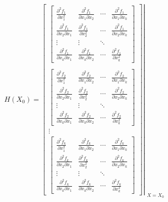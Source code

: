 \begin{equation}\label{eq:Hessian_tensor}
    H(X_0) = 
    \left. 
    \begin{bmatrix}
        \begin{bmatrix}
            \frac{\partial^2 f_1}{\partial x_1^2} & \frac{\partial^2 f_1}{\partial x_1 \partial x_2} & \cdots & \frac{\partial^2 f_1}{\partial x_1 \partial x_k} \\
            \frac{\partial^2 f_1}{\partial x_2 \partial x_1} & \frac{\partial^2 f_1}{\partial x_2^2} & \cdots & \frac{\partial^2 f_1}{\partial x_2 \partial x_k} \\
            \vdots & \vdots & \ddots \\
            \frac{\partial^2 f_1}{\partial x_k \partial x_1} & \frac{\partial^2 f_1}{\partial x_k \partial x_2} & \cdots & \frac{\partial^2 f_1}{\partial x_k^2} 
        \end{bmatrix}
        \\
        \\
        \begin{bmatrix}
            \frac{\partial^2 f_2}{\partial x_1^2} & \frac{\partial^2 f_2}{\partial x_1 \partial x_2} & \cdots & \frac{\partial^2 f_2}{\partial x_1 \partial x_k} \\
            \frac{\partial^2 f_2}{\partial x_2 \partial x_1} & \frac{\partial^2 f_2}{\partial x_2^2} & \cdots & \frac{\partial^2 f_2}{\partial x_2 \partial x_k} \\
            \vdots & \vdots & \ddots \\
            \frac{\partial^2 f_2}{\partial x_k \partial x_1} & \frac{\partial^2 f_2}{\partial x_k \partial x_2} & \cdots & \frac{\partial^2 f_2}{\partial x_k^2} 
        \end{bmatrix}
        \\
        \vdots
        \\
        \begin{bmatrix}
            \frac{\partial^2 f_k}{\partial x_1^2} & \frac{\partial^2 f_k}{\partial x_1 \partial x_2} & \cdots & \frac{\partial^2 f_k}{\partial x_1 \partial x_k} \\
            \frac{\partial^2 f_k}{\partial x_2 \partial x_1} & \frac{\partial^2 f_k}{\partial x_2^2} & \cdots & \frac{\partial^2 f_k}{\partial x_2 \partial x_k} \\
            \vdots & \vdots & \ddots \\
            \frac{\partial^2 f_k}{\partial x_k \partial x_1} & \frac{\partial^2 f_k}{\partial x_k \partial x_2} & \cdots & \frac{\partial^2 f_k}{\partial x_k^2}    
        \end{bmatrix}
    \end{bmatrix}
    \right|_{\substack{X = X_0}}
\end{equation}

